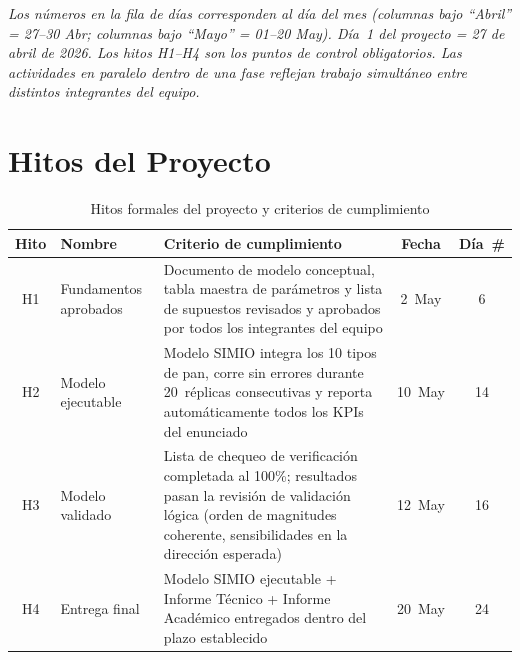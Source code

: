 \documentclass[12pt]{article}
\begin{document}
\vspace{0.2cm}
{\scriptsize\color{grisoscuro}
\textit{Los n\'umeros en la fila de d\'ias corresponden al d\'ia del mes
(columnas bajo ``Abril'' = 27--30 Abr; columnas bajo ``Mayo'' = 01--20 May).
D\'ia~1 del proyecto = 27 de abril de 2026.
Los hitos H1--H4 son los puntos de control obligatorios.
Las actividades en paralelo dentro de una fase reflejan trabajo
simult\'aneo entre distintos integrantes del equipo.}}


\clearpage
\pdfpagewidth=210mm
\pdfpageheight=297mm
\restoregeometry
\pagestyle{fancy}
\newpage

\section{Hitos del Proyecto}

\begin{table}[h!]
\centering
\caption{Hitos formales del proyecto y criterios de cumplimiento}
\label{tab:hitos}
\renewcommand{\arraystretch}{1.4}
\begin{tabularx}{\textwidth}{clXcc}
\toprule
\rowcolor{tabhead}
\color{white}\textbf{Hito} &
\color{white}\textbf{Nombre} &
\color{white}\textbf{Criterio de cumplimiento} &
\color{white}\textbf{Fecha} &
\color{white}\textbf{Día~\#} \\
\midrule
\rowcolor{tabrow}
H1 & Fundamentos aprobados &
Documento de modelo conceptual, tabla maestra de parámetros y lista de supuestos revisados y aprobados por todos los integrantes del equipo &
2~May & 6 \\

H2 & Modelo ejecutable &
Modelo SIMIO integra los 10 tipos de pan, corre sin errores durante 20~réplicas consecutivas y reporta automáticamente todos los KPIs del enunciado &
10~May & 14 \\

\rowcolor{tabrow}
H3 & Modelo validado &
Lista de chequeo de verificación completada al 100\%; resultados pasan la revisión de validación lógica (orden de magnitudes coherente, sensibilidades en la dirección esperada) &
12~May & 16 \\

H4 & Entrega final &
Modelo SIMIO ejecutable + Informe Técnico + Informe Académico entregados dentro del plazo establecido &
20~May & 24 \\
\bottomrule
\end{tabularx}
\end{table}
\end{document}
